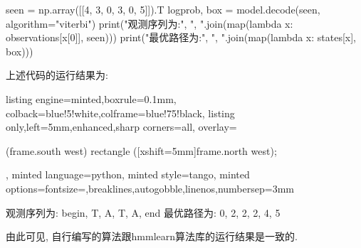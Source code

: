 \documentclass{article}
\begin{document}
\begin{homeworkProblem}
\begin{tcblisting}
seen = np.array([[4, 3, 0, 3, 0, 5]]).T
logprob, box = model.decode(seen, algorithm="viterbi")
print("观测序列为:", ", ".join(map(lambda x: observations[x[0]], seen)))
print("最优路径为:", ", ".join(map(lambda x: states[x], box)))
\end{tcblisting}
上述代码的运行结果为:
\begin{tcblisting}{listing engine=minted,boxrule=0.1mm,
colback=blue!5!white,colframe=blue!75!black,
listing only,left=5mm,enhanced,sharp corners=all,
overlay={\begin{tcbclipinterior} (frame.south west)
rectangle ([xshift=5mm]frame.north west);\end{tcbclipinterior}},
minted language=python,
minted style=tango,
minted options={fontsize=\small,breaklines,autogobble,linenos,numbersep=3mm}}
观测序列为: begin, T, A, T, A, end
最优路径为: 0, 2, 2, 2, 4, 5
\end{tcblisting}
由此可见, 自行编写的算法跟hmmlearn算法库的运行结果是一致的.
\end{homeworkProblem}

\pagebreak
\end{document}
